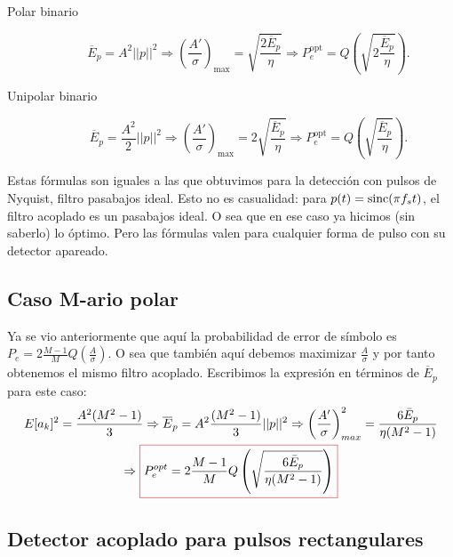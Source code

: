 \begin{description}
    \item[Polar binario]
    \[\overline{E}_p = A^2 ||p||^2 \Rightarrow
\left(\frac{A'}{\sigma}\right)_\text{max} =
\sqrt{\frac{2\overline{E}_p}{\eta}} \Rightarrow P_e^\text{opt} =
Q\left(\sqrt{2\frac{\overline{E}_p}{\eta}}\right).\]
    \item[Unipolar binario]
    \[\overline{E}_p = \frac{A^2}{2}||p||^2 \Rightarrow
\left(\frac{A'}{\sigma}\right)_\text{max} = 2
\sqrt{\frac{\overline{E}_p}{\eta}} \Rightarrow P_e^\text{opt} =
Q\left(\sqrt{\frac{\overline{E}_p}{\eta}}\right).\]
 \end{description}

Estas fórmulas son iguales a las que obtuvimos para la detección
con pulsos de Nyquist, filtro pasabajos ideal. Esto no es
casualidad: para $p(t) = \operatorname{sinc}(\pi f_s t)$, el filtro acoplado es
un pasabajos ideal. O sea que en ese caso ya hicimos (sin saberlo)
lo óptimo. Pero las fórmulas valen para cualquier forma de pulso
con su detector apareado.

\subsection*{Caso M-ario polar} Ya se vio anteriormente que aquí la
probabilidad de error de símbolo es $P_e=2\frac{M-1}{M}
Q\left(\frac{A}{\sigma}\right)$. O sea que también aquí debemos
maximizar $\frac{A}{\sigma}$ y por tanto obtenemos el mismo filtro
acoplado. Escribimos la expresión en términos de $\overline{E}_p$
para este caso:
\begin{gather*}
 E[a_k]^2 = \frac{A^2 (M^2-1)}{3} \Rightarrow \overline{E}_p = A^2 \frac{(M^2-1)}{3}||p||^2
\Rightarrow \left(\frac{A'}{\sigma}\right)^2_{max} = \frac{6 \bar{E}_p}{\eta (M^2-1)}\\
\Rightarrow {\col{P_e^{opt} = 2\frac{M-1}{M}
Q\left(\sqrt{\frac{6\bar{E}_p}{\eta(M^2-1)}}\right)}}
\end{gather*}

\subsection*{Detector acoplado para pulsos rectangulares}

